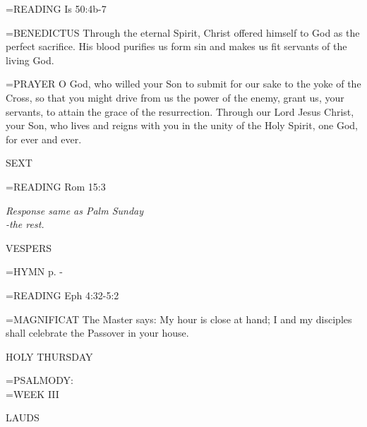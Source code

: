 \hangindent=\parindent \small{READING}    Is 50:4b-7 \textbf{   \\}

\hangindent=\parindent \small{BENEDICTUS 	Through the eternal Spirit, Christ offered himself to God as the perfect sacrifice. His blood purifies us form sin and makes us fit servants of the living God.\\}

\hangindent=\parindent \small{PRAYER 	O God, who willed your Son to submit for our sake to the yoke of the Cross, so that you might drive from us the power of the enemy, grant us, your servants, to attain the grace of the resurrection. Through our Lord Jesus Christ, your Son, who lives and reigns with you in the unity of the Holy Spirit, one God, for ever and ever.}

\begin{flushleft}\normalsize SEXT\\\end{flushleft}

\hangindent=\parindent \small{READING}    Rom 15:3 \textbf{   }

\begin{center}
\textit{Response same as Palm Sunday\\
-the rest.}
\end{center}

\begin{flushleft}\normalsize VESPERS\\\end{flushleft}

\hangindent=\parindent \small{\uppercase{HYMN} p.  \pageref{holyweek:firstHymn} - \pageref{holyweek:lastHymn}\\}

\hangindent=\parindent \small{READING}    Eph 4:32-5:2 \textbf{   \\}

\hangindent=\parindent \small{MAGNIFICAT 	The Master says: My hour is close at hand; I and my disciples shall celebrate the Passover in your house.\\}

\begin{center}
\normalsize HOLY THURSDAY
\end{center}

\hangindent=\parindent \small{PSALMODY:}\\
\hangindent=\parindent  WEEK III\vspace{0.5em}

\begin{flushleft}\normalsize LAUDS\\\end{flushleft}

